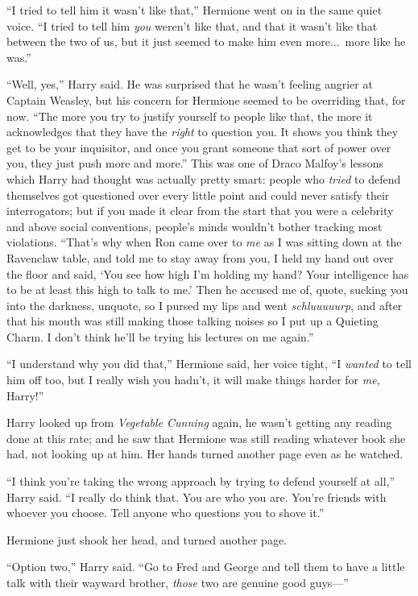 “I tried to tell him it wasn’t like that,” Hermione went on in the same quiet voice. “I tried to tell him \emph{you} weren’t like that, and that it wasn’t like that between the two of us, but it just seemed to make him even more...\ more like he was.”

“Well, yes,” Harry said. He was surprised that he wasn’t feeling angrier at Captain Weasley, but his concern for Hermione seemed to be overriding that, for now. “The more you try to justify yourself to people like that, the more it acknowledges that they have the \emph{right} to question you. It shows you think they get to be your inquisitor, and once you grant someone that sort of power over you, they just push more and more.” This was one of Draco Malfoy’s lessons which Harry had thought was actually pretty smart: people who \emph{tried} to defend themselves got questioned over every little point and could never satisfy their interrogators; but if you made it clear from the start that you were a celebrity and above social conventions, people’s minds wouldn’t bother tracking most violations. “That’s why when Ron came over to \emph{me} as I was sitting down at the Ravenclaw table, and told me to stay away from you, I held my hand out over the floor and said, ‘You see how high I’m holding my hand? Your intelligence has to be at least this high to talk to me.’ Then he accused me of, quote, sucking you into the darkness, unquote, so I pursed my lips and went \emph{schluuuuurp}, and after that his mouth was still making those talking noises so I put up a Quieting Charm. I don’t think he’ll be trying his lectures on me again.”

“I understand why you did that,” Hermione said, her voice tight, “I \emph{wanted} to tell him off too, but I really wish you hadn’t, it will make things harder for \emph{me,} Harry!”

Harry looked up from \emph{Vegetable Cunning} again, he wasn’t getting any reading done at this rate; and he saw that Hermione was still reading whatever book she had, not looking up at him. Her hands turned another page even as he watched.

“I think you’re taking the wrong approach by trying to defend yourself at all,” Harry said. “I really do think that. You are who you are. You’re friends with whoever you choose. Tell anyone who questions you to shove it.”

Hermione just shook her head, and turned another page.

“Option two,” Harry said. “Go to Fred and George and tell them to have a little talk with their wayward brother, \emph{those} two are genuine good guys—”

